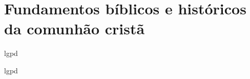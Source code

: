 \newpage
\section{Fundamentos bíblicos e históricos da comunhão cristã}

\gls{lgpd}

\gls{lgpd}

\cite{cfw}